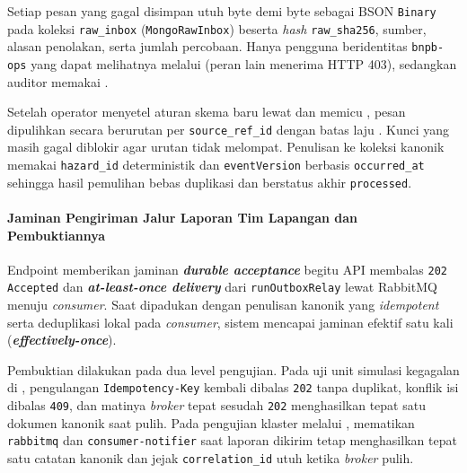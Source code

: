 Setiap pesan yang gagal disimpan utuh byte demi byte sebagai BSON \texttt{Binary} pada koleksi \texttt{raw\_inbox} (\texttt{MongoRawInbox}) beserta \textit{hash} \texttt{raw\_sha256}, sumber, alasan penolakan, serta jumlah percobaan. Hanya pengguna beridentitas \texttt{bnpb-ops} yang dapat melihatnya melalui  (peran lain menerima HTTP 403), sedangkan auditor memakai .

Setelah operator menyetel aturan skema baru lewat  dan memicu , pesan dipulihkan secara berurutan per \texttt{source\_ref\_id} dengan batas laju . Kunci yang masih gagal diblokir agar urutan tidak melompat. Penulisan ke koleksi kanonik memakai \texttt{hazard\_id} deterministik dan \texttt{eventVersion} berbasis \texttt{occurred\_at} sehingga hasil pemulihan bebas duplikasi dan berstatus akhir \texttt{processed}.

\paragraph*{Jaminan Pengiriman Jalur Laporan Tim Lapangan dan Pembuktiannya}
Endpoint  memberikan jaminan \textbf{\textit{durable acceptance}} begitu API membalas \texttt{202 Accepted} dan \textbf{\textit{at-least-once delivery}} dari \texttt{runOutboxRelay} lewat RabbitMQ menuju \textit{consumer}. Saat dipadukan dengan penulisan kanonik yang \textit{idempotent} serta deduplikasi lokal pada \textit{consumer}, sistem mencapai jaminan efektif satu kali (\textbf{\textit{effectively-once}}).

Pembuktian dilakukan pada dua level pengujian. Pada uji unit simulasi kegagalan di , pengulangan \texttt{Idempotency-Key} kembali dibalas \texttt{202} tanpa duplikat, konflik isi dibalas \texttt{409}, dan matinya \textit{broker} tepat sesudah \texttt{202} menghasilkan tepat satu dokumen kanonik saat pulih. Pada pengujian klaster melalui , mematikan \texttt{rabbitmq} dan \texttt{consumer-notifier} saat laporan dikirim tetap menghasilkan tepat satu catatan kanonik dan jejak \texttt{correlation\_id} utuh ketika \textit{broker} pulih.
